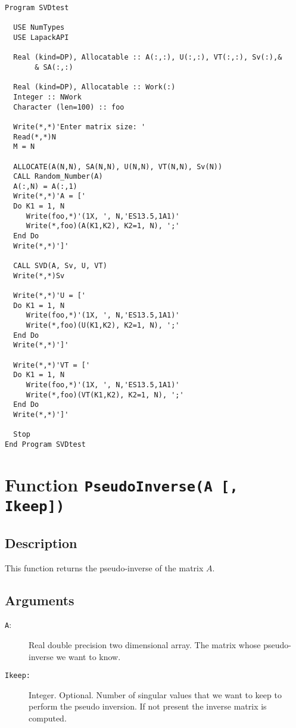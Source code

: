 \begin{lstlisting}[emph=SVD,
                   emphstyle=\color{blue},
                   frame=trBL,
                   caption=Using lapack library to perform a SVD decomposition.,
                   label=svd]
Program SVDtest

  USE NumTypes
  USE LapackAPI

  Real (kind=DP), Allocatable :: A(:,:), U(:,:), VT(:,:), Sv(:),&
       & SA(:,:)

  Real (kind=DP), Allocatable :: Work(:)
  Integer :: NWork
  Character (len=100) :: foo

  Write(*,*)'Enter matrix size: '
  Read(*,*)N
  M = N

  ALLOCATE(A(N,N), SA(N,N), U(N,N), VT(N,N), Sv(N))
  CALL Random_Number(A)
  A(:,N) = A(:,1)
  Write(*,*)'A = ['
  Do K1 = 1, N
     Write(foo,*)'(1X, ', N,'ES13.5,1A1)'
     Write(*,foo)(A(K1,K2), K2=1, N), ';'
  End Do
  Write(*,*)']'

  CALL SVD(A, Sv, U, VT)
  Write(*,*)Sv

  Write(*,*)'U = ['
  Do K1 = 1, N
     Write(foo,*)'(1X, ', N,'ES13.5,1A1)'
     Write(*,foo)(U(K1,K2), K2=1, N), ';'
  End Do
  Write(*,*)']'

  Write(*,*)'VT = ['
  Do K1 = 1, N
     Write(foo,*)'(1X, ', N,'ES13.5,1A1)'
     Write(*,foo)(VT(K1,K2), K2=1, N), ';'
  End Do
  Write(*,*)']'

  Stop
End Program SVDtest
\end{lstlisting}

\section{Function \texttt{PseudoInverse(A [, Ikeep])}}

\subsection{Description}

This function returns the pseudo-inverse of the matrix $A$.

\subsection{Arguments}

\begin{description}
\item[\texttt{A}:]  Real double precision two dimensional array. The
  matrix whose pseudo-inverse we want to know.

\item[\texttt{Ikeep: }] Integer. Optional. Number of singular values
  that we want to keep to perform the pseudo inversion. If not present
  the inverse matrix is computed. 

\end{description}

